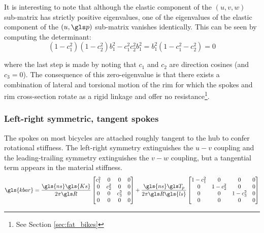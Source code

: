 \documentclass[\rootdir/thesis.tex]{subfiles}
\begin{document}
It is interesting to note that although the elastic component of the $(u,v,w)$ sub-matrix has strictly positive eigenvalues, one of the eigenvalues of the elastic component of the $(u,\p)$ sub-matrix vanishes identically. This can be seen by computing the determinant:
\begin{equation}
(1-c_1^2)(1-c_2^2)b_1^2 - c_1^2c_2^2b_1^2 = b_1^2(1 - c_1^2 - c_2^2) = 0
\end{equation}

where the last step is made by noting that $c_1$ and $c_2$ are direction cosines (and $c_3=0$). The consequence of this zero-eigenvalue is that there exists a combination of lateral and torsional motion of the rim for which the spokes and rim cross-section rotate as a rigid linkage and offer no resistance\footnote{See Section \ref{sec:fat_bikes}}.

\subsubsection*{Left-right symmetric, tangent spokes}
The spokes on most bicycles are attached roughly tangent to the hub to confer rotational stiffness. The left-right symmetry extinguishes the $u-v$ coupling and the leading-trailing symmetry extinguishes the $v-w$ coupling, but a tangential term appears in the material stiffness.
\begin{equation}
\label{eq:kbar_symm_ncross}
\gls{kbar} = \frac{\gls{ns} \gls{Ks}}{2\pi \R}
\begin{bmatrix}
c_1^2     & 0     & 0 & 0\\
0 & c_2^2 & 0     & 0\\
0 & 0     & c_3^2 & 0\\
0 & 0     & 0     & 0
\end{bmatrix} +
\frac{\gls{ns} \T_p}{2\pi \R \gls{ls}}
\begin{bmatrix}
1-c_1^2 & 0       & 0       & 0\\
0       & 1-c_2^2 & 0       & 0\\
0       & 0       & 1-c_3^2 & 0\\
0       & 0       & 0       & 0
\end{bmatrix}
\end{equation}
\end{document}

